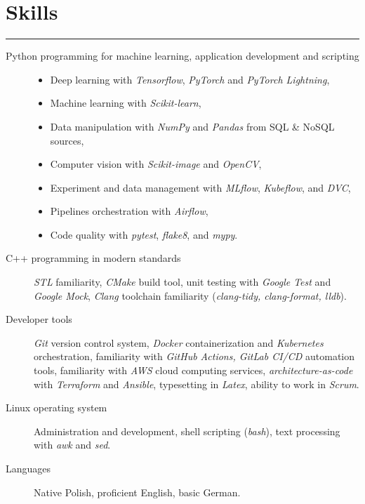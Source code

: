 \documentclass{article}
\begin{document}
\section*{Skills}

\hrule \medskip

{
\begin{description}
	\item[Python programming for machine learning, application development and scripting]
		\begin{itemize}
			\item Deep learning with \textit{Tensorflow}, \textit{PyTorch} and \textit{PyTorch Lightning},
			\item Machine learning with \textit{Scikit-learn},
			\item Data manipulation with \textit{NumPy} and \textit{Pandas} from SQL \& NoSQL sources,
			\item Computer vision with \textit{Scikit-image} and \textit{OpenCV},
			\item Experiment and data management with \textit{MLflow}, \textit{Kubeflow}, and \textit{DVC},
			\item Pipelines orchestration with \textit{Airflow},
			\item Code quality with \textit{pytest}, \textit{flake8}, and \textit{mypy}.
		\end{itemize}
	\item[C++ programming in modern standards]
		\textit{STL} familiarity,
		\textit{CMake} build tool,
		unit testing with \textit{Google Test} and \textit{Google Mock},
		\textit{Clang} toolchain familiarity (\textit{clang-tidy, clang-format, lldb}).
	\item[Developer tools]
			\textit{Git} version control system,
			\textit{Docker} containerization and \textit{Kubernetes} orchestration,
			familiarity with \textit{GitHub Actions, GitLab CI/CD} automation tools,
			familiarity with \textit{AWS} cloud computing services,
			\textit{architecture-as-code} with \textit{Terraform} and \textit{Ansible}, 
			typesetting in \textit{Latex},
			ability to work in \textit{Scrum}.
	\item[Linux operating system]
		Administration and development,
		shell scripting (\textit{bash}),
		text processing with \textit{awk} and \textit{sed}.
	\item[Languages]
		Native Polish,
		proficient English,
		basic German.
\end{description}
}
\end{document}
